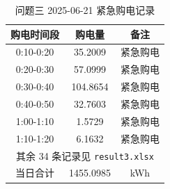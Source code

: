 \begin{table}[htbp]
\centering
\caption{问题三 2025-06-21 紧急购电记录}\label{tab:q3-emergency}
\normalsize\setlength{\tabcolsep}{6pt}
\begin{tabular}{@{}ccc@{}}
\toprule
购电时间段 & 购电量 & 备注 \\
\midrule
0:10-0:20 & 35.2009 & 紧急购电 \\
0:20-0:30 & 57.0999 & 紧急购电 \\
0:30-0:40 & 104.8654 & 紧急购电 \\
0:40-0:50 & 32.7603 & 紧急购电 \\
1:00-1:10 & 1.5729 & 紧急购电 \\
1:10-1:20 & 6.1632 & 紧急购电 \\
\multicolumn{3}{c}{其余 34 条记录见 \texttt{result3.xlsx}} \\
\midrule
当日合计 & 1455.0985 & kWh \\
\bottomrule
\end{tabular}
\end{table}
